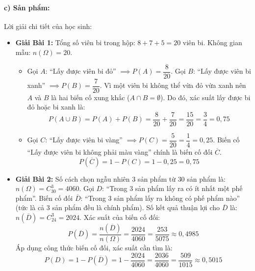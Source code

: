 \documentclass[12pt, a4paper]{article}
\begin{document}
\paragraph{c) Sản phẩm:} Lời giải chi tiết của học sinh:
\begin{itemize}[leftmargin=0.8cm]
    \item \textbf{Giải Bài 1:}
    Tổng số viên bi trong hộp: $8 + 7 + 5 = 20$ viên bi. Không gian mẫu: $n(\Omega) = 20$.
    \begin{itemize}[leftmargin=0.4cm]
        \item[a)] Gọi $A$: ``Lấy được viên bi đỏ'' $\implies P(A) = \dfrac{8}{20}$. Gọi $B$: ``Lấy được viên bi xanh'' $\implies P(B) = \dfrac{7}{20}$.
        Vì một viên bi không thể vừa đỏ vừa xanh nên $A$ và $B$ là hai biến cố xung khắc ($A \cap B = \emptyset$).
        Do đó, xác suất lấy được bi đỏ hoặc bi xanh là:
        $$P(A \cup B) = P(A) + P(B) = \dfrac{8}{20} + \dfrac{7}{20} = \dfrac{15}{20} = \dfrac{3}{4} = 0{,}75$$
        \item[b)] Gọi $C$: ``Lấy được viên bi vàng'' $\implies P(C) = \dfrac{5}{20} = \dfrac{1}{4} = 0{,}25$.
        Biến cố ``Lấy được viên bi không phải màu vàng'' chính là biến cố đối $\overline{C}$.
        $$P(\overline{C}) = 1 - P(C) = 1 - 0{,}25 = 0{,}75$$
    \end{itemize}
    \item \textbf{Giải Bài 2:}
    Số cách chọn ngẫu nhiên $3$ sản phẩm từ $30$ sản phẩm là: $n(\Omega) = C_{30}^3 = 4060$.
    Gọi $D$: ``Trong $3$ sản phẩm lấy ra có ít nhất một phế phẩm''.
    Biến cố đối $\overline{D}$: ``Trong $3$ sản phẩm lấy ra không có phế phẩm nào'' (tức là cả $3$ sản phẩm đều là chính phẩm).
    Số kết quả thuận lợi cho $\overline{D}$ là: $n(\overline{D}) = C_{24}^3 = 2024$.
    Xác suất của biến cố đối:
    $$P(\overline{D}) = \dfrac{n(\overline{D})}{n(\Omega)} = \dfrac{2024}{4060} = \dfrac{253}{5075} \approx 0{,}4985$$
    Áp dụng công thức biến cố đối, xác suất cần tìm là:
    $$P(D) = 1 - P(\overline{D}) = 1 - \dfrac{2024}{4060} = \dfrac{2036}{4060} = \dfrac{509}{1015} \approx 0{,}5015$$
\end{itemize}
\end{document}
